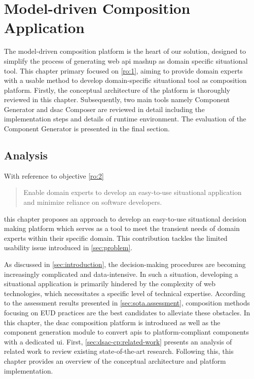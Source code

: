 \hypertarget{sec:dsac-composition-platform}{%
\chapter{Model-driven Composition Application}\label{sec:dsac-composition-platform}}
The model-driven composition platform is the heart of our solution, designed to simplify the process of generating web \gls{api} mashup as domain specific situational tool. This chapter primary focused on \cref{ro:1}, aiming to provide domain experts with a usable method to develop domain-specific situational tool as composition platform. Firstly, the conceptual architecture of the platform is thoroughly reviewed in this chapter. Subsequently, two main tools namely Component Generator and \gls{dsac} Composer are reviewed in detail including the implementation steps and details of runtime environment. The evaluation of the Component Generator is presented in the final section.

\vspace{-10pt}
\hypertarget{sec:cp.analysis}{%
\section{Analysis}\label{sec:cp.analysis}}
\vspace{10pt}

With reference to objective \cref{ro:2}

\begin{quote}
Enable domain experts to develop an easy-to-use situational application and minimize reliance on software developers.
\end{quote}
this chapter proposes an approach to develop an easy-to-use situational decision making platform which serves as a tool to meet the transient needs of domain experts within their specific \gls{domain}. This contribution tackles the limited usability issue introduced in \cref{sec:problem}. 

As discussed in \cref{sec:introduction}, the decision-making procedures are becoming increasingly complicated and data-intensive. In such a situation, developing a situational application is primarily hindered by the complexity of web technologies, which necessitates a specific level of technical expertise. According to the assessment results presented in \cref{sec:sota.assessment}, composition methods focusing on EUD practices are the best candidates to alleviate these obstacles. In this chapter, the \gls{dsac} composition platform is introduced as well as the component generation module to convert \gls{api}s to platform-compliant components with a dedicated \gls{ui}. 
First, \cref{sec:dsac-cp:related-work} presents an analysis of related work to review existing state-of-the-art research. Following this, this chapter provides an overview of the conceptual architecture and platform implementation.

